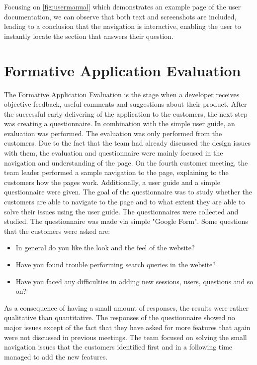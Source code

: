 \documentclass{l3proj}
\begin{document}
Focusing on \autoref{fig:usermanual} which demonstrates an example page of the user documentation, we can observe that both text and screenshots are included, leading to a conclusion that the navigation is interactive, enabling the user to instantly locate the section that answers their question.

\section{Formative Application Evaluation}
\label{sec:appEval}

The Formative Application Evaluation is the stage when a developer receives objective feedback, useful comments and suggestions about their product.  After the successful early delivering of the application to the customers, the next step was creating a questionnaire. In combination with the simple user guide, an evaluation was performed. The evaluation was only performed from the customers. Due to the fact that the team had already discussed the design issues with them, the evaluation and questionnaire were mainly focused in the navigation and understanding of the page. On the  fourth customer meeting, the team leader performed a sample navigation to the page, explaining to the customers how the pages work.  Additionally, a user guide and a simple questionnaire were given. The goal of the questionnaire was to study whether the customers are able to navigate to the page and to what extent they are able to solve their issues using the user guide. The questionnaires were collected and studied.  The questionnaire was made via simple "Google Form". Some questions that the customers were asked are:
\begin{itemize}
 \item In general do you like the look and the feel of the website?
 \item Have you found trouble performing search queries in the website?
 \item Have you faced any difficulties in adding new sessions, users, questions and so on?
\end{itemize}

As a consequence of having a small amount of responses, the results were rather qualitative than quantitative. The responses of the questionnaire showed no major issues except of the fact that they have asked for more features that again were not discussed in previous meetings.  The team focused on solving the small navigation issues that the customers identified first and in a following time managed to add the new features. 
\end{document}
